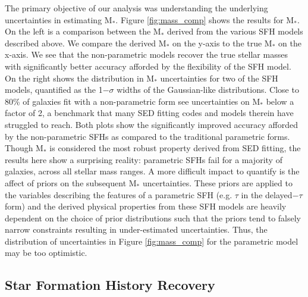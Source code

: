 \documentclass[twocolumn]{aastex62}
\begin{document}
The primary objective of our analysis was understanding the underlying uncertainties in estimating M$_*$. Figure \ref{fig:mass_comp} shows the results for M$_*$. On the left is a comparison between the M$_*$ derived from the various SFH models described above. We compare the derived M$_*$ on the y-axis to the true M$_*$ on the x-axis. We see that the non-parametric models recover the true stellar masses with significantly better accuracy afforded by the flexibility of the SFH model. On the right shows the distribution in M$_*$ uncertainties for two of the SFH models, quantified as the 1$-\sigma$ widths of the Gaussian-like distributions. Close to 80\% of galaxies fit with a non-parametric form see uncertainties on M$_*$ below a factor of 2, a benchmark that many SED fitting codes and models therein have struggled to reach. Both plots show the significantly improved accuracy afforded by the non-parametric SFHs as compared to the traditional parametric forms. Though M$_*$ is considered the most robust property derived from SED fitting, the results here show a surprising reality: parametric SFHs fail for a majority of galaxies, across all stellar mass ranges. A more difficult impact to quantify is the affect of priors on the subsequent M$_*$ uncertainties. These priors are applied to the variables describing the features of a parametric SFH (e.g. $\tau$ in the delayed$-\tau$ form) and the derived physical properties from these SFH models are heavily dependent on the choice of prior distributions such that the priors tend to falsely narrow constraints resulting in under-estimated uncertainties. Thus, the distribution of uncertainties in Figure \ref{fig:mass_comp} for the parametric model may be too optimistic. 

\subsection{Star Formation History Recovery}\label{section:sfhs}
\end{document}
